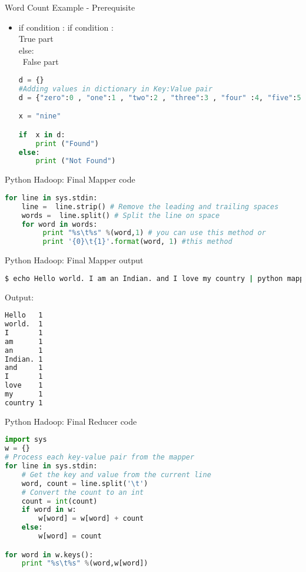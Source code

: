 \documentclass[pdf]{beamer}
\begin{document}
\begin{frame}[fragile]{Word Count Example - Prerequisite}
\begin{itemize}
	\item if condition :
		if condition :
\\			True part
\\		else:
\\\			False part
		  
\begin{lstlisting}[language=python]
d = {} 
#Adding values in dictionary in Key:Value pair
d = {"zero":0 , "one":1 , "two":2 , "three":3 , "four" :4, "five":5, "six":6, "seven":7, "eight":8, "nine":9 }

x = "nine"

if  x in d:
	print ("Found")
else:
	print ("Not Found")

\end{lstlisting}
\end{itemize}		
\end{frame}





\begin{frame}[fragile]{Python Hadoop: Final Mapper code}
\begin{lstlisting}[language=python]
for line in sys.stdin:
    line =  line.strip() # Remove the leading and trailing spaces
    words =  line.split() # Split the line on space
    for word in words:
         print "%s\t%s" %(word,1) # you can use this method or
         print '{0}\t{1}'.format(word, 1) #this method
\end{lstlisting}
\end{frame}

\begin{frame}[fragile]{Python Hadoop: Final Mapper output}
\begin{lstlisting}[language=bash]
$ echo Hello world. I am an Indian. and I love my country | python mapper.py 
\end{lstlisting}
Output:
\begin{lstlisting}[language=bash]
Hello   1
world.  1
I       1
am      1
an      1
Indian. 1
and     1
I       1
love    1
my      1
country 1
\end{lstlisting}
\end{frame}


\begin{frame}[fragile]{Python Hadoop: Final Reducer code}
\begin{lstlisting}[language=python]
import sys
w = {}
# Process each key-value pair from the mapper
for line in sys.stdin:
    # Get the key and value from the current line
    word, count = line.split('\t')
    # Convert the count to an int
    count = int(count)
    if word in w:
        w[word] = w[word] + count
    else:
        w[word] = count

for word in w.keys():
    print "%s\t%s" %(word,w[word])
\end{lstlisting}
\end{frame}
\end{document}
